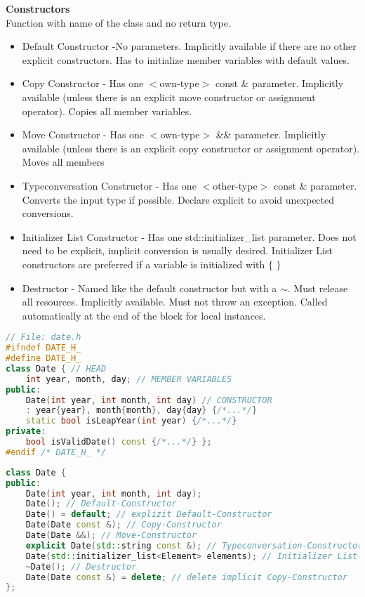 \textbf{Constructors} \\
Function with name of the class and no return type. 
\begin{itemize}
    \item Default Constructor -No parameters. Implicitly available if there are no other explicit constructors. Has to initialize member variables with default values.
    \item Copy Constructor - Has one $<$own-type$>$ const \& parameter. Implicitly available (unless there is an explicit move constructor or assignment operator). Copies all member variables.
    \item Move Constructor - Has one $<$own-type$>$ \&\& parameter. Implicitly available (unless there is an explicit copy constructor or assignment operator). Moves all members
    \item Typeconversation Constructor - Has one $<$other-type$>$ const \& parameter. Converts the input type if possible. Declare explicit to avoid unexpected conversions.
    \item Initializer List Constructor - Has one std::initializer\_list parameter. Does not need to be explicit, implicit conversion is usually desired. Initializer List constructors are preferred if a variable is initialized with $\{$ $\}$
    \item Destructor - Named like the default constructor but with a $\sim$. Must release all resources. Implicitly available. Must not throw an exception. Called automatically at the end of the block for local instances.
\end{itemize}

\begin{lstlisting}[language=C++]
// File: date.h
#ifndef DATE_H_ 
#define DATE_H_
class Date { // HEAD
	int year, month, day; // MEMBER VARIABLES
public:
	Date(int year, int month, int day) // CONSTRUCTOR
	: year{year}, month{month}, day{day} {/*...*/}
	static bool isLeapYear(int year) {/*...*/}
private:
	bool isValidDate() const {/*...*/} };
#endif /* DATE_H_ */
\end{lstlisting}

\begin{lstlisting}[language=C++]
class Date {
public:
    Date(int year, int month, int day);
    Date(); // Default-Constructor
    Date() = default; // explizit Default-Constructor
    Date(Date const &); // Copy-Constructor
    Date(Date &&); // Move-Constructor
    explicit Date(std::string const &); // Typeconversation-Constructor
    Date(std::initializer_list<Element> elements); // Initializer List-Constructor
    ~Date(); // Destructor
    Date(Date const &) = delete; // delete implicit Copy-Constructor
};
\end{lstlisting}

